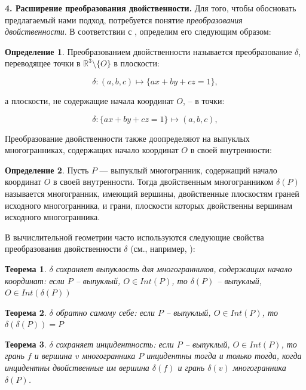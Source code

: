 \documentclass[a4paper, 10pt]{article}
\theoremstyle{definition}
\newtheorem{SmartDefinition}{Определение}
\theoremstyle{plain}
\newtheorem{SmartTheorem}{Теорема}
\theoremstyle{plain}
\begin{document}
\textbf{4. Расширение преобразования двойственности.}
Для того, чтобы обосновать предлагаемый нами подход, потребуется понятие
\textit{преобразования двойственности}. В соответствии с
\cite{PreparataShamos}, определим его следующим образом:

\begin{SmartDefinition}
 Преобразованием двойственности называется преобразование $\delta$, переводящее
 точки в $\mathbb{R}^{3} \setminus \{O\}$ в плоскости:

 \begin{equation*}
  \delta: (a, b, c) \mapsto \{a x + b y + c z = 1\},
 \end{equation*}

 а плоскости, не содержащие начала координат $O$, -- в точки:

 \begin{equation*}
  \delta: \{a x + b y + c z = 1\} \mapsto (a, b, c),
 \end{equation*}
\end{SmartDefinition}

Преобразование двойственности также доопределяют на выпуклых многогранниках,
содержащих начало координат $O$ в своей внутренности:

\begin{SmartDefinition}
 Пусть $P$ --- выпуклый многогранник, содержащий начало координат $O$ в своей
 внутренности. Тогда двойственным многогранником $\delta(P)$ называется
 многогранник, имеющий вершины, двойственные плоскостям граней исходного
 многогранника, и грани, плоскости которых двойственны вершинам исходного
 многогранника.
\end{SmartDefinition}

В вычислительной геометрии часто используются следующие свойства преобразования
двойственности $\delta$ (см., например, \cite{Chazelle}):

\begin{SmartTheorem}
\label{theorem:automorhism}
 $\delta$ сохраняет выпуклость для многогранников, содержащих начало координат:
 если $P$ -- выпуклый, $O \in Int(P)$, то $\delta(P)$ -- выпуклый,
 $O \in Int(\delta(P))$
\end{SmartTheorem}

\begin{SmartTheorem}
\label{theorem:self-inverse}
 $\delta$ обратно самому себе: если $P$ -- выпуклый, $O \in Int(P)$, то
 $\delta(\delta(P)) = P$
\end{SmartTheorem}

\begin{SmartTheorem}
\label{theorem:incidence-saving}
 $\delta$ сохраняет инцидентность: если $P$ -- выпуклый, $O \in Int(P)$, то
 грань $f$ и вершина $v$ многогранника $P$ инцидентны тогда и только тогда,
 когда инцидентны двойственные им вершина $\delta(f)$ и грань $\delta(v)$
 многогранника $\delta(P)$.
\end{SmartTheorem}
\end{document}
